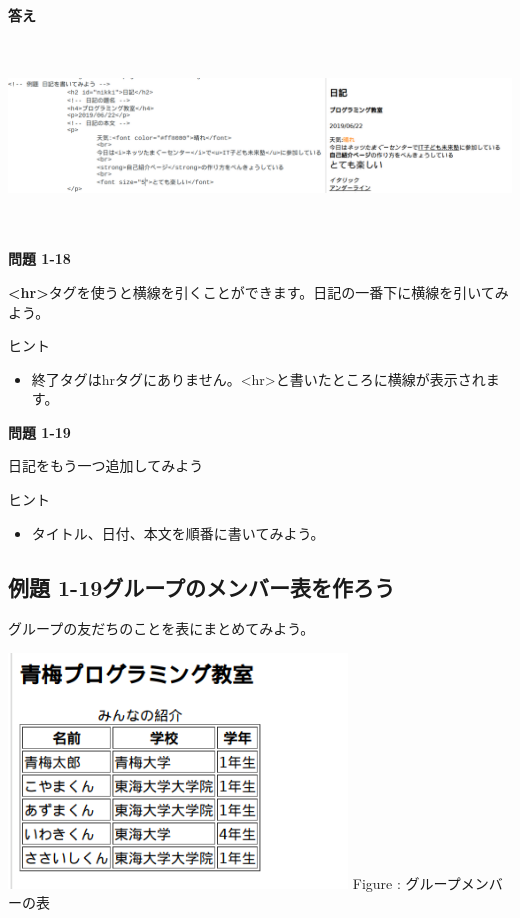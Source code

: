 \documentclass[a4paper,12pt]{jarticle}
\begin{document}
\clearpage
\textbf{答え}



\includegraphics[width=16.163cm,height=5.057cm]{textbook-img188.png}

{\bfseries
  問題 1-18}

\textbf{{\textless}hr{\textgreater}}タグを使うと横線を引くことができます。日記の一番下に横線を引いてみよう。

ヒント

\begin{itemize}
  \item
        終了タグはhrタグにありません。{\textless}hr{\textgreater}と書いたところに横線が表示されます。
\end{itemize}
{\bfseries
問題 1-19}

日記をもう一つ追加してみよう

ヒント

\begin{itemize}
  \item
        タイトル、日付、本文を順番に書いてみよう。
\end{itemize}
\clearpage\subsection{例題
  1-19グループのメンバー表を作ろう}
グループの友だちのことを表にまとめてみよう。

\centering
\begin{minipage}{8.998cm}
  {\upshape
    \includegraphics[width=8.998cm,height=6.234cm]{textbook-img189.png}
    \newline
    Figure : グループメンバーの表}
\end{minipage}
\end{document}
